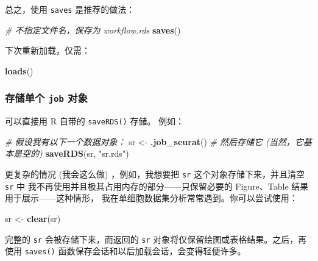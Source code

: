 \documentclass[
]{article}
\newenvironment{Shaded}{\begin{snugshade}}{\end{snugshade}}
\newcommand{\CommentTok}[1]{\textcolor[rgb]{0.56,0.35,0.01}{\textit{#1}}}
\newcommand{\KeywordTok}[1]{\textcolor[rgb]{0.13,0.29,0.53}{\textbf{#1}}}
\newcommand{\NormalTok}[1]{#1}
\newcommand{\StringTok}[1]{\textcolor[rgb]{0.31,0.60,0.02}{#1}}
\begin{document}
总之，使用 \texttt{saves} 是推荐的做法：

\begin{Shaded}
\begin{Highlighting}[]
\CommentTok{\# 不指定文件名，保存为 \textquotesingle{}workflow.rds\textquotesingle{}}
\KeywordTok{saves}\NormalTok{()}
\end{Highlighting}
\end{Shaded}

下次重新加载，仅需：

\begin{Shaded}
\begin{Highlighting}[]
\KeywordTok{loads}\NormalTok{()}
\end{Highlighting}
\end{Shaded}

\hypertarget{ux5b58ux50a8ux5355ux4e2a-job-ux5bf9ux8c61}{%
\subsubsection{\texorpdfstring{存储单个 \texttt{job} 对象}{存储单个 job 对象}}\label{ux5b58ux50a8ux5355ux4e2a-job-ux5bf9ux8c61}}

可以直接用 R 自带的 \texttt{saveRDS()} 存储。
例如：

\begin{Shaded}
\begin{Highlighting}[]
\CommentTok{\# 假设我有以下一个数据对象：}
\NormalTok{sr \textless{}{-}}\StringTok{ }\KeywordTok{.job\_seurat}\NormalTok{()}
\CommentTok{\# 然后存储它 (当然，它基本是空的) }
\KeywordTok{saveRDS}\NormalTok{(sr, }\StringTok{"sr.rds"}\NormalTok{)}
\end{Highlighting}
\end{Shaded}

更复杂的情况 (我会这么做) ，例如，我想要把 \texttt{sr} 这个对象存储下来，并且清空 \texttt{sr} 中
我不再使用并且极其占用内存的部分------只保留必要的 Figure、Table 结果用于展示------这种情形，
我在单细胞数据集分析常常遇到。你可以尝试使用：

\begin{Shaded}
\begin{Highlighting}[]
\NormalTok{sr \textless{}{-}}\StringTok{ }\KeywordTok{clear}\NormalTok{(sr)}
\end{Highlighting}
\end{Shaded}

完整的 \texttt{sr} 会被存储下来，而返回的 \texttt{sr} 对象将仅保留绘图或表格结果。之后，再使用
\texttt{saves()} 函数保存会话和以后加载会话，会变得轻便许多。
\end{document}
